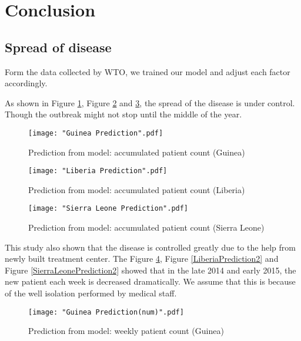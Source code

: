 \documentclass[11pt]{article}
\begin{document}
\section{Conclusion}

\subsection{Spread of disease}

Form the data collected by WTO, we trained our model and adjust each factor accordingly.

As shown in Figure \ref{GuineaPrediction}, Figure \ref{LiberiaPrediction} and \ref{SierraLeonePrediction}, the spread of the disease is under control. Though the outbreak might not stop until the middle of the year.

\begin{figure}[htbp]
\centerline{\texttt{[image: "Guinea Prediction".pdf]}}
\caption{Prediction from model: accumulated patient count (Guinea)}
\label{GuineaPrediction}
\end{figure}

\begin{figure}[htbp]
\centerline{\texttt{[image: "Liberia Prediction".pdf]}}
\caption{Prediction from model: accumulated patient count (Liberia)}
\label{LiberiaPrediction}
\end{figure}

\begin{figure}[htbp]
\centerline{\texttt{[image: "Sierra Leone Prediction".pdf]}}
\caption{Prediction from model: accumulated patient count (Sierra Leone)}
\label{SierraLeonePrediction}
\end{figure}


This study also shown that the disease is controlled greatly due to the help from newly built treatment center. The Figure \ref{GuineaPrediction2}, Figure \ref{LiberiaPrediction2} and Figure \ref{SierraLeonePrediction2} showed that in the late 2014 and early 2015, the new patient each week is decreased dramatically. We assume that this is because of the well isolation performed by medical staff.

\begin{figure}[htbp]
\centerline{\texttt{[image: "Guinea Prediction(num)".pdf]}}
\caption{Prediction from model: weekly patient count (Guinea)}
\label{GuineaPrediction2}
\end{figure}
\end{document}
